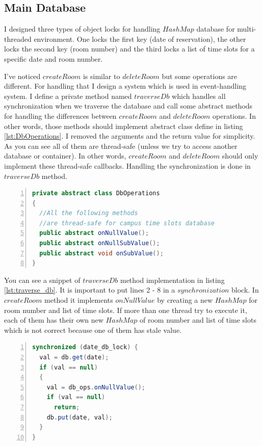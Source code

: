 \documentclass[12pt]{article}
\begin{document}
\subsection{Main Database}
I designed three types of object locks for handling $HashMap$ database for multi-threaded environment. One locks the first key (date of reservation), the other locks the second key (room number) and the third locks a list of time slots for a specific date and room number.
\par I've noticed $createRoom$ is similar to $deleteRoom$ but some operations are different. For handling that I design a system which is used in event-handling system. I define a private method named $traverseDb$ which handles all synchronization when we traverse the database and call some abstract methods for handling the differences between $createRoom$ and $deleteRoom$ operations. In other words, those methods should implement abstract class define in listing \ref{lst:DbOperations}. I removed the arguments and the return value for simplicity. As you can see all of them are thread-safe (unless we try to access another database or container). In other words, $createRoom$ and $deleteRoom$ should only implement these thread-safe callbacks. Handling the synchronization is done in $traverseDb$ method.

\begin{lstlisting}[language=java,label={lst:DbOperations},caption={DbOperations abstract class},numbers=left]
private abstract class DbOperations
{
  //All the following methods 
  //are thread-safe for campus time slots database
  public abstract onNullValue();
  public abstract onNullSubValue();
  public abstract void onSubValue();
}
\end{lstlisting}

\par You can see a snippet of $traverseDb$ method implementation in listing \ref{lst:traverse_db}. It is important to put lines 2 - 8 in a $synchronization$ block. In $createRoom$ method it implements $onNullValue$ by creating a new $HashMap$ for room number and list of time slots. If more than one thread try to execute it, each of them has their own new $HashMap$ of room number and list of time slots which is not correct because one of them has stale value.

\begin{lstlisting}[language=java,label={lst:traverse_db},caption={Snippet from traverseDb method},numbers=left]
synchronized (date_db_lock) {
  val = db.get(date);
  if (val == null)
  {
    val = db_ops.onNullValue();
    if (val == null)
      return;
    db.put(date, val);
  }
}		
\end{lstlisting}
\end{document}

